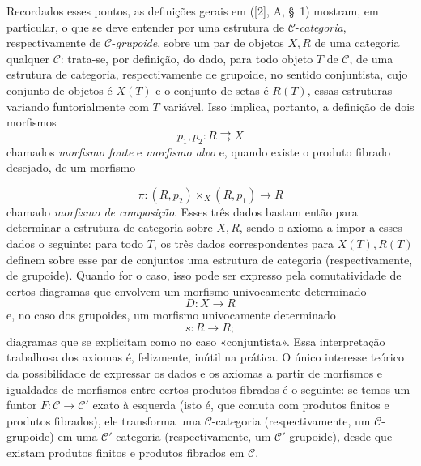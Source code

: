 \documentclass[11pt,twoside,openany]{book}
\numberwithin{equation}{section}
\newcommand{\src}[1]{%
  \phantomsection\hypertarget{src:#1}{}%
  \marginpar{\raggedleft\footnotesize\sffamily #1}%
}
\theoremstyle{plain}
\theoremstyle{definition}
\theoremstyle{remark}
\newcommand{\FgaUnitKey}{frontmatter}
\renewcommand{\src}[1]{%
  \phantomsection\hypertarget{src:\FgaUnitKey:#1}{}%
  \marginpar{\raggedleft\footnotesize\sffamily #1}%
}
\begin{document}
Recordados esses pontos, as definições gerais em ([2], A, \S~1) mostram, em
particular, o que se deve entender por uma estrutura de
$\mathcal C$-\emph{categoria}, respectivamente de
$\mathcal C$-\emph{grupoide}, sobre um par de objetos $X,R$ de uma categoria
qualquer $\mathcal C$: trata-se, por definição, do dado, para todo objeto $T$
de $\mathcal C$, de uma estrutura de categoria, respectivamente de grupoide,
no sentido conjuntista, cujo conjunto de objetos é $X(T)$ e o conjunto de
setas é $R(T)$, essas estruturas
\guillemotleft variando funtorialmente\guillemotright{} com $T$ variável.
Isso implica, portanto, a definição de dois morfismos
\[
  p_1,p_2:R\rightrightarrows X
\]
chamados \emph{morfismo fonte} e \emph{morfismo alvo} e, quando existe o
produto fibrado desejado, de um morfismo
\src{107}
\[
  \pi:(R,p_2)\times_X(R,p_1)\longrightarrow R
\]
chamado \emph{morfismo de composição}. Esses três dados bastam então para
determinar a estrutura de categoria sobre $X,R$, sendo o axioma a impor a
esses dados o seguinte: para todo $T$, os três dados correspondentes para
$X(T),R(T)$ definem sobre esse par de conjuntos uma estrutura de categoria
(respectivamente, de grupoide). Quando for o caso, isso pode ser expresso pela
comutatividade de certos diagramas que envolvem um morfismo univocamente
determinado
\[
  D:X\longrightarrow R
\]
e, no caso dos grupoides, um morfismo univocamente determinado
\[
  s:R\longrightarrow R;
\]
diagramas que se explicitam como no caso «conjuntista». Essa interpretação
trabalhosa dos axiomas é, felizmente, inútil na prática. O único interesse
teórico da possibilidade de expressar os dados e os axiomas a partir de
morfismos e igualdades de morfismos entre certos produtos fibrados é o
seguinte: se temos um funtor $F:\mathcal C\to\mathcal C'$ exato à esquerda
(isto é, que comuta com produtos finitos e produtos fibrados), ele transforma
uma $\mathcal C$-categoria (respectivamente, um $\mathcal C$-grupoide) em uma
$\mathcal C'$-categoria (respectivamente, um $\mathcal C'$-grupoide), desde
que existam produtos finitos e produtos fibrados em $\mathcal C$.
\end{document}
